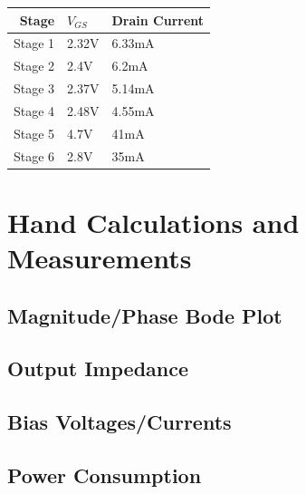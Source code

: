 \documentclass[11pt, twoside, letterpaper]{article}
\begin{document}
\begin{tabular}{|r|l|l|}
\hline
Stage & $V_{GS}$ & Drain Current\\
\hline
Stage 1 &2.32V&6.33mA\\
Stage 2 &2.4V&6.2mA\\
Stage 3 &2.37V&5.14mA\\
Stage 4 &2.48V&4.55mA\\
Stage 5 &4.7V&41mA\\
Stage 6 &2.8V&35mA\\
\end{tabular}



\section{Hand Calculations and Measurements}
\subsection*{Magnitude/Phase Bode Plot}
\subsection*{Output Impedance}
\subsection*{Bias Voltages/Currents}
\subsection*{Power Consumption}
\end{document}
